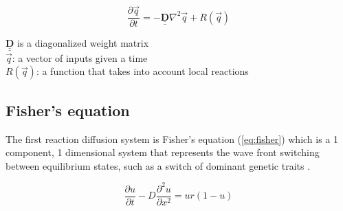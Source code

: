 \documentclass[12pt, letterpaper]{article}
\begin{document}
\begin{singlespace}
  \begin{equation}
    \label{eq:genRD}
    \frac{\partial \vec{q}}{\partial t} = − \underline{\underline{\mathbf{D}}} \nabla^2 \vec{q} + R(\vec{q})
  \end{equation}
  \begin{small}
    $\underline{\underline{\mathbf{D}}}$ is a diagonalized weight matrix \\
    $\vec{q}$: a vector of inputs given a time \\
    $R(\vec{q})$: a function that takes into account local reactions
  \end{small}
\end{singlespace}

\subsection{Fisher's equation} \label{fisher}
The first reaction diffusion system is Fisher's equation (\ref{eq:fisher}) which is a 1 component, 1
dimensional system that represents the wave front switching between equilibrium states, such as a switch of
dominant genetic traits \citep{fisher}.

\begin{equation}
  \label{eq:fisher}
  \frac{\partial u}{\partial t} - D \frac{\partial^2 u}{\partial x^2} = ur(1 - u) 
\end{equation}
\end{document}

